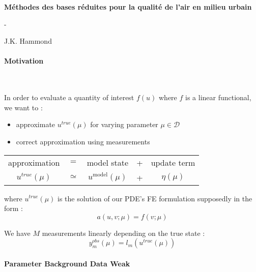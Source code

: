 \documentclass{article}
\newcommand{\mo}{\text{model}}
\begin{document}
\begin{center}\Large\bf
Méthodes des bases réduites pour la qualité de l'air en milieu urbain


\large-
 

J.K. Hammond\end{center}

\bigskip


\paragraph{Motivation}~


In order to evaluate a quantity of interest $f(u)$ where $f$ is a linear functional, we want to :
\begin{itemize}
\item approximate $u^{true}(\mu)$  for varying parameter $\mu\in\mathcal D$
\item correct approximation using measurements
\end{itemize}



\begin{center}\begin{tabular}{ccccc}approximation& $=$ &model state& + &update term\\

$u^{true}(\mu)$& $\simeq$ &$u^\mo(\mu)$& + &$\eta(\mu)$
\end{tabular}\end{center}


where $u^{true}(\mu)$ is the solution of our PDE's FE formulation supposedly in the form : $$a(u,v;\mu)=f(v;\mu)$$



We have $M$ measurements linearly depending on the true state : $$y^{obs}_m(\mu)=l_m(u^{true}(\mu))$$
 

\paragraph{Parameter Background Data Weak}~
\end{document}
